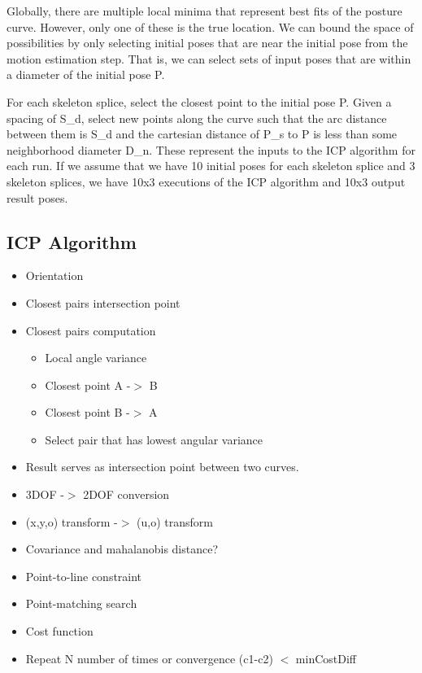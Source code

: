 Globally, there are multiple local minima that represent best fits of the posture curve. However, only one of these is the true location. We can bound the space of possibilities by only selecting initial poses that are near the initial pose from the motion estimation step. That is, we can select sets of input poses that are within a diameter of the initial pose P.

For each skeleton splice, select the closest point to the initial pose P. Given a spacing of S\_d, select new points along the curve such that the arc distance between them is S\_d and the cartesian distance of P\_s to P is less than some neighborhood diameter D\_n. These represent the inputs to the ICP algorithm for each run. If we assume that we have 10 initial poses for each skeleton splice and 3 skeleton splices, we have 10x3 executions of the ICP algorithm and 10x3 output result poses.

\subsection{ICP Algorithm}
\label{icpalgorithm}

\begin{itemize}
\item Orientation

\item Closest pairs intersection point

\item Closest pairs computation

\begin{itemize}
\item Local angle variance

\item Closest point A -$>$ B

\item Closest point B -$>$ A

\item Select pair that has lowest angular variance

\end{itemize}

\item Result serves as intersection point between two curves. 

\item 3DOF -$>$ 2DOF conversion

\item (x,y,o) transform -$>$ (u,o) transform

\item Covariance and mahalanobis distance? 

\item Point-to-line constraint

\item Point-matching search

\item Cost function

\item Repeat N number of times or convergence (c1-c2) $<$ minCostDiff

\end{itemize}

